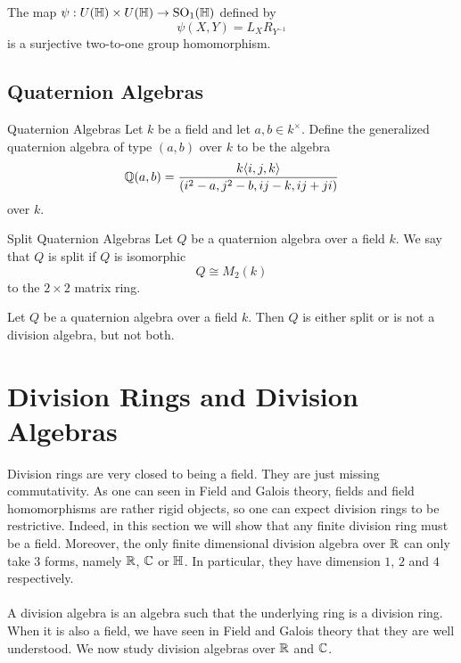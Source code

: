 \documentclass[a4paper]{article}
\begin{document}
\begin{thm}{}{} The map $\psi:U(\mathbb{H})\times U(\mathbb{H})\to\text{SO}_1(\mathbb{H})$ defined by $$\psi(X,Y)=L_XR_{Y^{-1}}$$ is a surjective two-to-one group homomorphism. 
\end{thm}

\subsection{Quaternion Algebras}
\begin{defn}{Quaternion Algebras}{} Let $k$ be a field and let $a,b\in k^\times$. Define the generalized quaternion algebra of type $(a,b)$ over $k$ to be the algebra $$\mathbb{Q}(a,b)=\frac{k\langle i,j,k\rangle}{(i^2-a,j^2-b,ij-k,ij+ji)}$$ over $k$. 
\end{defn}

\begin{defn}{Split Quaternion Algebras}{} Let $Q$ be a quaternion algebra over a field $k$. We say that $Q$ is split if $Q$ is isomorphic $$Q\cong M_2(k)$$ to the $2\times 2$ matrix ring. 
\end{defn}

\begin{thm}{}{} Let $Q$ be a quaternion algebra over a field $k$. Then $Q$ is either split or is not a division algebra, but not both. 
\end{thm}

\pagebreak
\section{Division Rings and Division Algebras}
Division rings are very closed to being a field. They are just missing commutativity. As one can seen in Field and Galois theory, fields and field homomorphisms are rather rigid objects, so one can expect division rings to be restrictive. Indeed, in this section we will show that any finite division ring must be a field. Moreover, the only finite dimensional division algebra over $\mathbb{R}$ can only take $3$ forms, namely $\mathbb{R}$, $\mathbb{C}$ or $\mathbb{H}$. In particular, they have dimension $1$, $2$ and $4$ respectively. \\~\\

A division algebra is an algebra such that the underlying ring is a division ring. When it is also a field, we have seen in Field and Galois theory that they are well understood. We now study division algebras over $\mathbb{R}$ and $\mathbb{C}$. 
\end{document}
